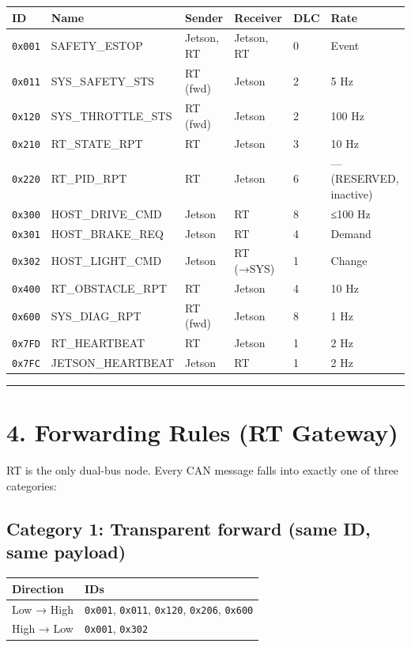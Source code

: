\documentclass[12pt,a4paper,oneside]{report}
\begin{document}
\begin{longtable}[]{@{}llllll@{}}
\toprule\noalign{}
ID & Name & Sender & Receiver & DLC & Rate \\
\midrule\noalign{}
\endhead
\bottomrule\noalign{}
\endlastfoot
\texttt{0x001} & SAFETY\_ESTOP & Jetson, RT & Jetson, RT & 0 & Event \\
\texttt{0x011} & SYS\_SAFETY\_STS & RT (fwd) & Jetson & 2 & 5 Hz \\
\texttt{0x120} & SYS\_THROTTLE\_STS & RT (fwd) & Jetson & 2 & 100 Hz \\
\texttt{0x210} & RT\_STATE\_RPT & RT & Jetson & 3 & 10 Hz \\
\texttt{0x220} & RT\_PID\_RPT & RT & Jetson & 6 & --- (RESERVED, inactive) \\
\texttt{0x300} & HOST\_DRIVE\_CMD & Jetson & RT & 8 & ≤100 Hz \\
\texttt{0x301} & HOST\_BRAKE\_REQ & Jetson & RT & 4 & Demand \\
\texttt{0x302} & HOST\_LIGHT\_CMD & Jetson & RT (→SYS) & 1 & Change \\
\texttt{0x400} & RT\_OBSTACLE\_RPT & RT & Jetson & 4 & 10 Hz \\
\texttt{0x600} & SYS\_DIAG\_RPT & RT (fwd) & Jetson & 8 & 1 Hz \\
\texttt{0x7FD} & RT\_HEARTBEAT & RT & Jetson & 1 & 2 Hz \\
\texttt{0x7FC} & JETSON\_HEARTBEAT & Jetson & RT & 1 & 2 Hz \\
\end{longtable}

\begin{center}\rule{0.5\linewidth}{0.5pt}\end{center}

\section{4. Forwarding Rules (RT Gateway)}\label{forwarding-rules-rt-gateway}

RT is the only dual-bus node. Every CAN message falls into exactly one of three
categories:

\subsection{Category 1: Transparent forward (same ID, same
payload)}\label{category-1-transparent-forward-same-id-same-payload}

\begin{longtable}[]{@{}ll@{}}
\toprule\noalign{}
Direction & IDs \\
\midrule\noalign{}
\endhead
\bottomrule\noalign{}
\endlastfoot
Low → High & \texttt{0x001}, \texttt{0x011}, \texttt{0x120}, \texttt{0x206},
\texttt{0x600} \\
High → Low & \texttt{0x001}, \texttt{0x302} \\
\end{longtable}
\end{document}
